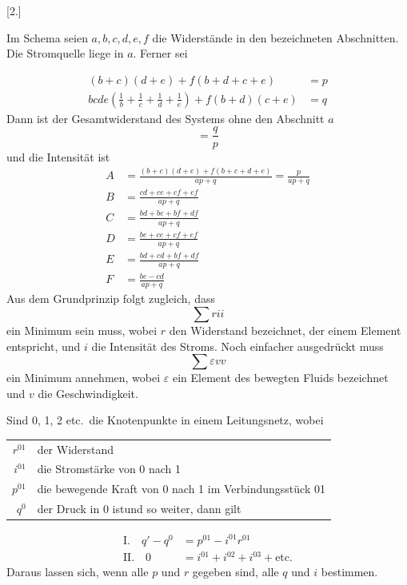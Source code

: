 \begin{center}[2.]\end{center}
Im Schema seien $a,b,c,d,e,f$ die Widerstände in den bezeichneten Abschnitten. Die Stromquelle liege in $a$. Ferner sei
\begin{center}\resizebox{.28\linewidth}{!}{}\end{center}
\[
\begin{aligned}
(b+c)(d+e)+f(b+d+c+e)&=p\\
bcde\left(\frac{1}{b}+\frac{1}{c}+\frac{1}{d}+\frac{1}{e}\right)+f(b+d)(c+e)&=q
\end{aligned}
\]
Dann ist der Gesamtwiderstand des Systems ohne den Abschnitt $a$
\[
=\frac{q}{p}
\]
und die Intensität ist
\[
\begin{aligned}
A&=\frac{(b+c)(d+e)+f(b+c+d+e)}{ap+q}=\frac{p}{ap+q}\\[4pt]
B&=\frac{cd+ce+cf+ef}{ap+q}\\[4pt]
C&=\frac{bd+be+bf+df}{ap+q}\\[4pt]
D&=\frac{be+ce+cf+ef}{ap+q}\\[4pt]
E&=\frac{bd+cd+bf+df}{ap+q}\\[4pt]
F&=\frac{be-cd}{ap+q}
\end{aligned}
\]
Aus dem Grundprinzip folgt zugleich, dass
\[
\sum rii
\]
ein Minimum sein muss, wobei $r$ den Widerstand bezeichnet, der einem Element entspricht, und $i$ die Intensität des Stroms. Noch einfacher ausgedrückt muss
\[
\sum\varepsilon vv
\]
ein Minimum annehmen, wobei $\varepsilon$ ein Element des bewegten Fluids bezeichnet und $v$ die Geschwindigkeit.

Sind 0, 1, 2 etc.\ die Knotenpunkte in einem Leitungsnetz, wobei
\begin{center}\begin{tabular}{rl}
$r^{01}$ & der Widerstand\\
$i^{01}$ & die Stromstärke von 0 nach 1\\
$p^{01}$ & die bewegende Kraft von 0 nach 1 im Verbindungsstück 01\\
$q^0$ & der Druck in 0 ist\quad und so weiter, dann gilt
\end{tabular}\end{center}
\[
\begin{aligned}
\text{I.}\quad q'-q^0&=p^{01}-i^{01}r^{01}\\
\text{II.}\quad 0&=i^{01}+i^{02}+i^{03}+\text{etc.}
\end{aligned}
\]
Daraus lassen sich, wenn alle $p$ und $r$ gegeben sind, alle $q$ und $i$ bestimmen.

